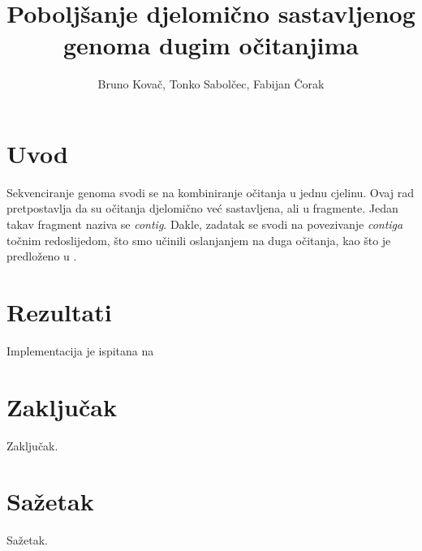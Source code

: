 \documentclass[times, utf8, seminar, numeric]{fer}
\begin{document}
\nocite{*}

\title{Poboljšanje djelomično sastavljenog genoma dugim očitanjima}

\author{Bruno Kovač, Tonko Sabolčec, Fabijan Čorak}


\maketitle

\tableofcontents

\chapter{Uvod}
Sekvenciranje genoma svodi se na kombiniranje očitanja u jednu cjelinu. Ovaj rad pretpostavlja da su očitanja djelomično već sastavljena, ali u fragmente. Jedan takav fragment naziva se \textit{contig}. Dakle, zadatak se svodi na povezivanje \textit{contiga} točnim redoslijedom, što smo učinili oslanjanjem na duga očitanja, kao što je predloženo u \cite{Du345983}.

\chapter{Rezultati}
Implementacija je ispitana na 

\chapter{Zaključak}
Zaključak.




\chapter{Sažetak}
Sažetak.
\end{document}

